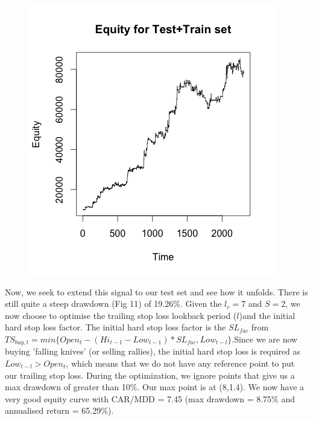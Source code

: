 \documentclass[12pt]{article}
\theoremstyle{definition}
\begin{document}
\begin{figure}[ht]
\centering
\includegraphics[scale=0.8]{final}
\label{fig:test9}
\end{figure}
Now, we seek to extend this signal to our test set and see how it unfolds. There is still quite a steep drawdown (Fig 11) of 19.26\%. Given the $l_{r}=7$ and $S=2$, we now choose to optimise the trailing stop loss lookback period ($l$)and the initial hard stop loss factor. The initial hard stop loss factor is the $SL_{fac}$ from $TS_{buy,t} = min\{Open_{t}-(Hi_{t-1}-Low_{t-1})*SL_{fac},Low_{t-l}\}$.Since we are now buying 'falling knives' (or selling rallies), the initial hard stop loss is required as $Low_{t-l}>Open_{t}$, which means that we do not have any reference point to put our trailing stop loss. During the optimization, we ignore points that give us a max drawdown of greater than 10\%. Our max point is at (8,1.4). We now have a very good equity curve with CAR/MDD = 7.45 (max drawdown = 8.75\% and annualised return = 65.29\%).
\end{document}
